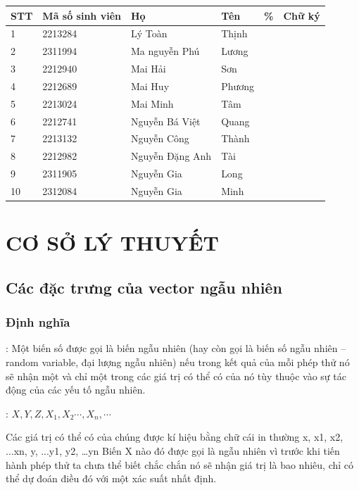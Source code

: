 \documentclass[12pt,a4paper]{article}
\begin{document}
\begin{tabular}{|m{10mm}|m{35mm}|m{35mm}|m{20mm}|m{10mm}|m{30mm}|} 
\hline
\textbf{STT } & \textbf{Mã số sinh viên} & \textbf{Họ} & \textbf{Tên} & \textbf{\%} & \textbf{Chữ ký}\\ \hline
1 & 2213284 & Lý Toàn & Thịnh & & \\ \hline
2 & 2311994 & Ma nguyễn Phú & Lương & & \\ \hline
3 & 2212940 & Mai Hải & Sơn & & \\ \hline
4 & 2212689 & Mai Huy & Phương & & \\ \hline
5 & 2213024 & Mai Minh & Tâm & & \\ \hline
6 & 2212741 & Nguyễn Bá Việt & Quang & & \\ \hline
7 & 2213132 & Nguyễn Công & Thành & & \\ \hline
8 & 2212982 & Nguyễn Đặng Anh & Tài & & \\ \hline
9 & 2311905 & Nguyễn Gia & Long & & \\ \hline
10 & 2312084 & Nguyễn Gia & Minh & & \\ \hline

\end{tabular}
\newpage
\onehalfspacing
\tableofcontents
\newpage
\section{CƠ SỞ LÝ THUYẾT}
\subsection{Các đặc trưng của vector ngẫu nhiên}
\subsubsection{Định nghĩa}
: Một biến số được gọi là biến ngẫu nhiên (hay còn gọi là biến số ngẫu nhiên – random variable, đại lượng ngẫu nhiên) nếu trong kết quả của mỗi phép thử nó sẽ nhận một và chỉ một trong các giá trị có thể có của nó tùy thuộc vào sự tác động của các yếu tố ngẫu nhiên.

: $X, Y, Z, X_1, X_2 \cdots, X_n, \cdots $

Các giá trị có thể có của chúng được kí hiệu bằng chữ cái in thường x, x1, x2, ...xn, y, ...y1, y2, …yn Biến X nào đó được gọi là ngẫu nhiên vì trước khi tiến hành phép thử ta chưa thể biết chắc chắn nó sẽ nhận giá trị là bao nhiêu, chỉ có thể dự đoán điều đó với một xác suất nhất định.
\end{document}
